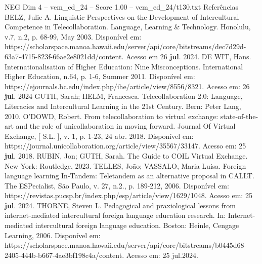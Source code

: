 \begin{textsample}{NEG Dim 4 – vem\_ed\_24 – Score 1.00 – vem\_ed\_24/t130.txt}
Referências BELZ, Julie A.
Linguistic Perspectives on the Development of Intercultural Competence in Telecollaboration.
Language, Learning \& Technology.
Honolulu, v.7, n.2, p. 68-99, May 2003.
Disponível em: https://scholarspace.manoa.hawaii.edu/server/api/core/bitstreams/dec7d29d-63a7-4715-823f-66ae2e8021dd/content.
Acesso em 26 \textbf{jul}. 2024.
DE WIT, Hans.
Internationalisation of Higher Education: Nine Misconceptions.
International Higher Education, n.64, p. 1-6, Summer 2011.
Disponível em: https://ejournals.bc.edu/index.php/ihe/article/view/8556/8321.
Acesso em: 26 \textbf{jul}. 2024 GUTH, Sarah; HELM, Francesca.
Telecollaboration 2.0: Language, Literacies and Intercultural Learning in the 21st Century.
Bern: Peter Lang, 2010.
O'DOWD, Robert.
From telecollaboration to virtual exchange: state-of-the-art and the role of unicollaboration in moving forward.
Journal Of Virtual Exchange, [ S.L. ], v. 1, p. 1-23, 24 abr. 2018.
Disponível em: https://journal.unicollaboration.org/article/view/35567/33147.
Acesso em: 25 \textbf{jul}. 2018.
RUBIN, Jon; GUTH, Sarah.
The Guide to COIL Virtual Exchange.
New York: Routledge, 2023.
TELLES, João; VASSALO, Maria Luisa.
Foreign language learning In-Tandem: Teletandem as an alternative proposal in CALLT.
The ESPecialist, São Paulo, v. 27, n.2., p. 189-212, 2006.
Disponível em: https://revistas.pucsp.br/index.php/esp/article/view/1629/1048.
Acesso em: 25 \textbf{jul}. 2024.
THORNE, Steven L.
Pedagogical and praxiological lessons from internet-mediated intercultural foreign language education research.
In: Internet-mediated intercultural foreign language education.
Boston: Heinle, Cengage Learning, 2006.
Disponível em: https://scholarspace.manoa.hawaii.edu/server/api/core/bitstreams/b0445d68-2405-444b-b667-4ae3bf198c4a/content.
Acesso em: 25 jul.2024.

\end{textsample}
